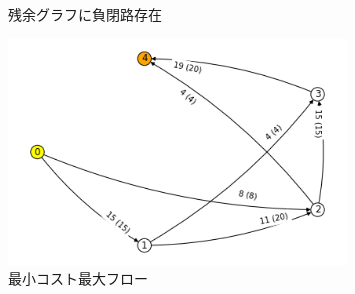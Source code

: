\documentclass{report}
\begin{document}
\begin{CJK}{UTF8}{min}
\begin{figure}[!h]
        \caption{残余グラフに負閉路存在}
    \end{figure}
    \begin{figure}[!h]
        \centerline{\includegraphics[width=0.8\textwidth]{data/ex12-MF-flow-result.png}}
        \caption{最小コスト最大フロー}



    \end{figure}
    \clearpage

\end{CJK}
\end{document}
